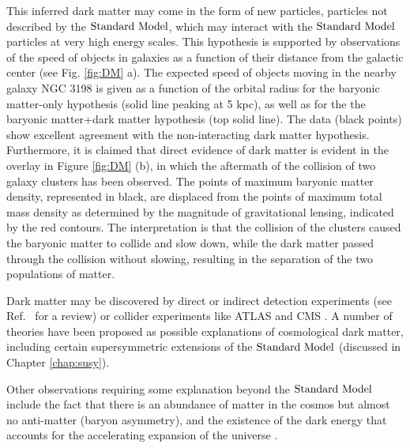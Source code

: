 This inferred dark matter may come in the form of new particles, particles not described by the $\text{Standard\ Model}$, which may interact with the $\text{Standard\ Model}$ particles at very high energy scales. This hypothesis is supported by observations of the speed of objects in galaxies as a function of their distance from the galactic center (see Fig. \ref{fig:DM} a). 
The expected speed of objects moving in the nearby galaxy NGC 3198 is given as a function of the orbital radius for the baryonic matter-only hypothesis (solid line peaking at 5 kpc), as well as for the  the baryonic matter+dark matter hypothesis (top solid line). The data (black points) show excellent agreement with the non-interacting dark matter hypothesis. Furthermore, it is claimed that direct evidence of dark matter is evident in the overlay in Figure \ref{fig:DM} (b), in which the aftermath of the collision of two galaxy clusters has been observed. The points of maximum baryonic matter density, represented in black, are displaced from the points of maximum total mass density as determined by the magnitude of gravitational lensing, indicated by the red contours. The interpretation is that the collision of the clusters caused the baryonic matter to collide and slow down, while the dark matter passed through the collision without slowing, resulting in the separation of the two populations of matter.

Dark matter may be discovered by direct or indirect detection experiments (see Ref.~\cite{Undagoitia:2015gya} for a review) or collider experiments like ATLAS \cite{Aad:2008zzm} and CMS \cite{Chatrchyan:2008aa}. A number of theories have been proposed as possible explanations of cosmological dark matter, including certain supersymmetric extensions of the $\text{Standard\ Model}$ (discussed in Chapter \ref{chap:susy}).


Other observations requiring some explanation beyond the $\text{Standard\ Model}$ include the fact that there is an abundance of matter in the cosmos but almost no anti-matter (baryon asymmetry), and the existence of the dark energy that accounts for the accelerating expansion of the universe \cite{Goldhaber:2009qu}.

